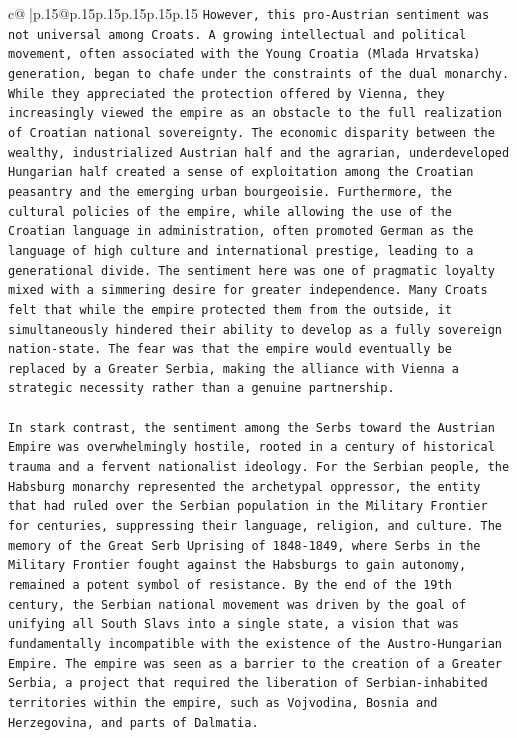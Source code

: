 \documentclass{article}
\begin{document}
{\begin{supertabular}{c@{$\;$}|p{.15\linewidth}@{}p{.15\linewidth}p{.15\linewidth}p{.15\linewidth}p{.15\linewidth}p{.15\linewidth}}
{{{\texttt{However, this pro{-}Austrian sentiment was not universal among Croats. A growing intellectual and political movement, often associated with the Young Croatia (Mlada Hrvatska) generation, began to chafe under the constraints of the dual monarchy. While they appreciated the protection offered by Vienna, they increasingly viewed the empire as an obstacle to the full realization of Croatian national sovereignty. The economic disparity between the wealthy, industrialized Austrian half and the agrarian, underdeveloped Hungarian half created a sense of exploitation among the Croatian peasantry and the emerging urban bourgeoisie. Furthermore, the cultural policies of the empire, while allowing the use of the Croatian language in administration, often promoted German as the language of high culture and international prestige, leading to a generational divide. The sentiment here was one of pragmatic loyalty mixed with a simmering desire for greater independence. Many Croats felt that while the empire protected them from the outside, it simultaneously hindered their ability to develop as a fully sovereign nation{-}state. The fear was that the empire would eventually be replaced by a Greater Serbia, making the alliance with Vienna a strategic necessity rather than a genuine partnership.} \\
\\ 
\texttt{In stark contrast, the sentiment among the Serbs toward the Austrian Empire was overwhelmingly hostile, rooted in a century of historical trauma and a fervent nationalist ideology. For the Serbian people, the Habsburg monarchy represented the archetypal oppressor, the entity that had ruled over the Serbian population in the Military Frontier for centuries, suppressing their language, religion, and culture. The memory of the Great Serb Uprising of 1848{-}1849, where Serbs in the Military Frontier fought against the Habsburgs to gain autonomy, remained a potent symbol of resistance. By the end of the 19th century, the Serbian national movement was driven by the goal of unifying all South Slavs into a single state, a vision that was fundamentally incompatible with the existence of the Austro{-}Hungarian Empire. The empire was seen as a barrier to the creation of a Greater Serbia, a project that required the liberation of Serbian{-}inhabited territories within the empire, such as Vojvodina, Bosnia and Herzegovina, and parts of Dalmatia.} \\
\\ 
}}}
\end{supertabular}}
\end{document}
